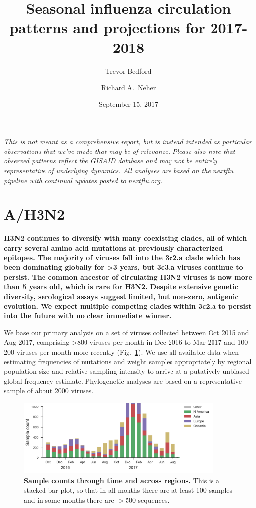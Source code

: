 \documentclass[11pt,oneside,letterpaper]{article}
\title{\vspace{2cm} \LARGE \bf
Seasonal influenza circulation patterns and projections for 2017-2018
}
\author[1]{Trevor Bedford}
\author[2]{Richard A.\ Neher}
\affil[1]{Vaccine and Infectious Disease Division, Fred Hutchinson Cancer Research Center, Seattle, WA, USA}
\affil[2]{Biozentrum, University of Basel, Basel, Switzerland}
\date{September 15, 2017}
\newcommand{\FIG}[1]{Fig.~\ref{#1}}
\begin{document}
\maketitle

\emph{This is not meant as a comprehensive report, but is instead
intended as particular observations that we've made that may be of
relevance. Please also note that observed patterns reflect the GISAID
database and may not be entirely representative of underlying dynamics.
All analyses are based on the nextflu pipeline \cite{neher2015nextflu}
with continual updates posted to \href{http://nextflu.org}{nextflu.org}.}

\tableofcontents

\pagebreak
\section*{A/H3N2}

\textbf{H3N2 continues to diversify with many coexisting clades, all of
which carry several amino acid mutations at previously characterized
epitopes. The majority of viruses fall into the 3c2.a clade which has
been dominating globally for \textgreater{}3 years, but 3c3.a viruses
continue to persist. The common ancestor of circulating H3N2 viruses is
now more than 5 years old, which is rare for H3N2. Despite extensive
genetic diversity, serological assays suggest limited, but non-zero,
antigenic evolution. We expect multiple competing clades within 3c2.a to
persist into the future with no clear immediate winner.}

We base our primary analysis on a set of viruses collected between Oct
2015 and Aug 2017, comprising \textgreater{}800 viruses per month in Dec
2016 to Mar 2017 and 100-200 viruses per month more recently (\FIG{h3n2_counts}). We use all
available data when estimating frequencies of mutations and weight
samples appropriately by regional population size and relative sampling
intensity to arrive at a putatively unbiased global frequency estimate.
Phylogenetic analyses are based on a representative sample of about 2000
viruses.

\begin{figure}[H]
  \centering
  \includegraphics[width=0.9\textwidth]{../figures/sep-2017/h3n2_counts.png}
  \caption{\textbf{Sample counts through time and across regions.}
  This is a stacked bar plot, so that in all months there are at least 100 samples and in some months there are $>500$ sequences.
  }
  \label{h3n2_counts}
\end{figure}
\end{document}
